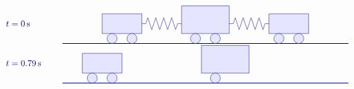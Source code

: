 \begin{solution}
\begin{itemize}
\begin{equation*}
\begin{tikzpicture}[scale=0.8, color=blue!50!black]
        \begin{scope}[yshift=0cm]
          \draw (-3,1) node[right] {$t=0\s$};
          \draw[thick] (0,0) -- (14.4,0);
          \begin{scope}[xshift=0cm]
            \draw[fill=blue!10] (2,0.5) rectangle (4,1.5);
            \draw[fill=blue!10] (2.5,0.25) circle (0.25);
            \draw[fill=blue!10] (3.5,0.25) circle (0.25);
          \end{scope}
          \begin{scope}[xshift=4.2cm]
            \draw[fill=blue!10] (1.8,0.5) rectangle (4.2,1.9);
            \draw[fill=blue!10] (2.5,0.25) circle (0.25);
            \draw[fill=blue!10] (3.5,0.25) circle (0.25);
          \end{scope}
          \begin{scope}[xshift=8.4cm]
            \draw[fill=blue!10] (2,0.5) rectangle (4,1.5);
            \draw[fill=blue!10] (2.5,0.25) circle (0.25);
            \draw[fill=blue!10] (3.5,0.25) circle (0.25);
          \end{scope}
          \begin{scope}[xshift=4cm]
            \draw (0,1) -- ++(0.2,0) -- ++(0.1,0.3)
            -- ++(0.2,-0.6) -- ++(0.2,0.6)
            -- ++(0.2,-0.6) -- ++(0.2,0.6)
            -- ++(0.2,-0.6) -- ++(0.2,0.6)
            -- ++(0.2,-0.6) -- ++(0.1,0.3)
            -- ++(0.2,0);
          \end{scope}
          \begin{scope}[xshift=8.4cm]
            \draw (0,1) -- ++(0.2,0) -- ++(0.1,0.3)
            -- ++(0.2,-0.6) -- ++(0.2,0.6)
            -- ++(0.2,-0.6) -- ++(0.2,0.6)
            -- ++(0.2,-0.6) -- ++(0.2,0.6)
            -- ++(0.2,-0.6) -- ++(0.1,0.3)
            -- ++(0.2,0);
          \end{scope}
        \end{scope}
        \begin{scope}[yshift=-2cm]
          \draw (-3,1) node[right] {$t=0.79\s$};
          \draw[thick] (0,0) -- (14.4,0);
          \begin{scope}[xshift=-1cm]
            \draw[fill=blue!10] (2,0.5) rectangle (4,1.5);
            \draw[fill=blue!10] (2.5,0.25) circle (0.25);
            \draw[fill=blue!10] (3.5,0.25) circle (0.25);
          \end{scope}
          \begin{scope}[xshift=5.2cm]
            \draw[fill=blue!10] (1.8,0.5) rectangle (4.2,1.9);
            \draw[fill=blue!10] (2.5,0.25) circle (0.25);

\end{scope}
\end{scope}
\end{tikzpicture}
\end{equation*}
\end{itemize}
\end{solution}

